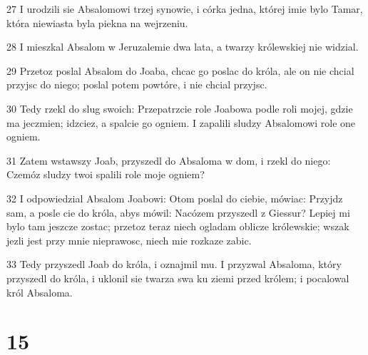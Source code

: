 \par 27 I urodzili sie Absalomowi trzej synowie, i córka jedna, której imie bylo Tamar, która niewiasta byla piekna na wejrzeniu.
\par 28 I mieszkal Absalom w Jeruzalemie dwa lata, a twarzy królewskiej nie widzial.
\par 29 Przetoz poslal Absalom do Joaba, chcac go poslac do króla, ale on nie chcial przyjsc do niego; poslal potem powtóre, i nie chcial przyjsc.
\par 30 Tedy rzekl do slug swoich: Przepatrzcie role Joabowa podle roli mojej, gdzie ma jeczmien; idzciez, a spalcie go ogniem. I zapalili sludzy Absalomowi role one ogniem.
\par 31 Zatem wstawszy Joab, przyszedl do Absaloma w dom, i rzekl do niego: Czemóz sludzy twoi spalili role moje ogniem?
\par 32 I odpowiedzial Absalom Joabowi: Otom poslal do ciebie, mówiac: Przyjdz sam, a posle cie do króla, abys mówil: Nacózem przyszedl z Giessur? Lepiej mi bylo tam jeszcze zostac; przetoz teraz niech ogladam oblicze królewskie; wszak jezli jest przy mnie nieprawosc, niech mie rozkaze zabic.
\par 33 Tedy przyszedl Joab do króla, i oznajmil mu. I przyzwal Absaloma, który przyszedl do króla, i uklonil sie twarza swa ku ziemi przed królem; i pocalowal król Absaloma.

\chapter{15}

